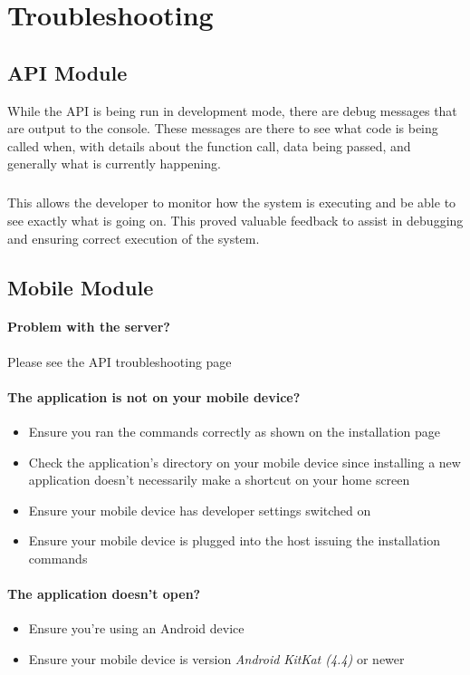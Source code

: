 \documentclass[12pt,a4paper]{article}
\begin{document}
\section{Troubleshooting}	
   \subsection{API Module}
While the API is being run in development mode, there are debug messages that are output to the console. These messages are there to see what code is being called when, with details about the function call, data being passed, and generally what is currently happening.
\subparagraph{}
This allows the developer to monitor how the system is executing and be able to see exactly what is going on. This proved valuable feedback to assist in debugging and ensuring correct execution of the system.
	
    \subsection{Mobile Module}
 	\paragraph{Problem with the server?}
		Please see the API troubleshooting page
\paragraph{The application is not on your mobile device?}
\begin{itemize}
\item Ensure you ran the commands correctly as shown on the installation page
\item Check the application's directory on your mobile device since installing a new application doesn't necessarily make a shortcut on your home screen
\item Ensure your mobile device has developer settings switched on
\item Ensure your mobile device is plugged into the host issuing the installation commands
\end{itemize} 
\paragraph{The application doesn't open?}
\begin{itemize}
\item Ensure you're using an Android device 
\item Ensure your mobile device is version \emph{Android KitKat (4.4)} or newer
\end{itemize}
\end{document}

